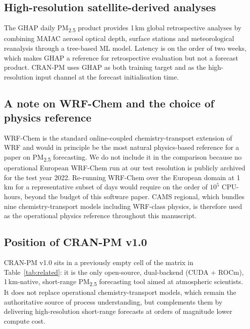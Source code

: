 \subsection{High-resolution satellite-derived analyses}

The GHAP daily PM\textsubscript{2.5} product \citep{wei2023ghap}
provides 1\,km global retrospective analyses by combining MAIAC
aerosol optical depth, surface stations and meteorological reanalysis
through a tree-based ML model. Latency is on the order of two weeks,
which makes GHAP a reference for retrospective evaluation but not a
forecast product. CRAN-PM uses GHAP as both training target and as
the high-resolution input channel at the forecast initialisation
time.

\subsection{A note on WRF-Chem and the choice of physics reference}

WRF-Chem \citep{grell2005wrfchem} is the standard online-coupled
chemistry-transport extension of WRF and would in principle be the
most natural physics-based reference for a paper on PM\textsubscript{2.5}
forecasting. We do not include it in the comparison because no
operational European WRF-Chem run at our test resolution is
publicly archived for the test year 2022. Re-running WRF-Chem over
the European domain at 1\,km for a representative subset of days
would require on the order of $10^5$ CPU-hours, beyond the budget of
this software paper. CAMS regional, which bundles nine
chemistry-transport models including WRF-class physics, is therefore
used as the operational physics reference throughout this manuscript.

\subsection{Position of CRAN-PM v1.0}

CRAN-PM v1.0 sits in a previously empty cell of the matrix in
Table~\ref{tab:related}: it is the only open-source, dual-backend
(CUDA + ROCm), 1\,km-native, short-range PM\textsubscript{2.5}
forecasting tool aimed at atmospheric scientists. It does not
replace operational chemistry-transport models, which remain the
authoritative source of process understanding, but complements them
by delivering high-resolution short-range forecasts at orders of
magnitude lower compute cost.

